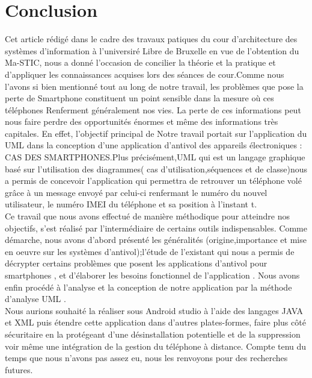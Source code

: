\documentclass[a4paper, 12pt]{article}
\begin{document}
\newpage
\section{Conclusion}

\quad Cet article rédigé dans le cadre des travaux patiques du cour d’architecture des systèmes d’information à l’universiré Libre de Bruxelle en vue de l’obtention du Ma-STIC, nous a donné l’occasion de concilier la théorie et la pratique et d’appliquer les connaissances acquises lors des séances de cour.Comme nous l’avons si bien mentionné tout au long de notre travail, les problèmes que pose la perte de Smartphone constituent un point sensible dans la mesure où ces téléphones Renferment généralement nos vies. La perte de ces informations peut nous faire perdre des opportunités énormes et même des informations très capitales. En effet, l’objectif principal de Notre travail portait sur l’application du UML dans la conception d’une application d’antivol des appareils électroniques : CAS DES SMARTPHONES.Plus précisément,UML qui est un langage graphique basé sur l’utilisation des diagrammes( cas d'utilisation,séquences et de classe)nous a permis de concevoir l'application qui permettra de retrouver un téléphone volé grâce à un message envoyé par celui-ci renfermant le numéro du nouvel utilisateur, le numéro IMEI du téléphone et sa position à l’instant t.\\


\quad Ce travail que nous avons effectué de manière méthodique pour atteindre nos objectifs, s’est réalisé par l’intermédiaire de certains outils indispensables. Comme démarche, nous avons d’abord présenté les généralités (origine,importance et mise en oeuvre sur les systèmes d’antivol);l’étude de l’existant qui nous a permis de décrypter certains problèmes que posent  les applications d’antivol pour smartphones , et d’élaborer les besoins fonctionnel de l'application . Nous avons enfin procédé à l'analyse et la conception de notre application par la méthode d’analyse UML .\\

\quad Nous aurions souhaité la réaliser sous Android studio à l’aide des langages JAVA et XML puis étendre cette application dans d’autres plates-formes, faire plus côté sécuritaire en la protégeant d’une désinstallation potentielle et de la suppression voir même une intégration de la gestion du téléphone à distance. Compte tenu du temps que nous n’avons pas assez eu, nous les renvoyons pour des recherches futures.
\end{document}

